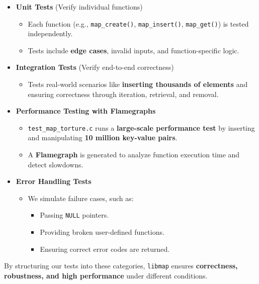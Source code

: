 \documentclass[titlepage]{article}
\begin{document}
\begin{itemize}
    \item \textbf{Unit Tests} (Verify individual functions)
    \begin{itemize}
        \item Each function (e.g., \texttt{map\_create()}, \texttt{map\_insert()}, \texttt{map\_get()}) is tested independently.
        \item Tests include \textbf{edge cases}, invalid inputs, and function-specific logic.
    \end{itemize}

    \item \textbf{Integration Tests} (Verify end-to-end correctness)
    \begin{itemize}
        \item Tests real-world scenarios like \textbf{inserting thousands of elements} and ensuring correctness through iteration, retrieval, and removal.
    \end{itemize}

    \item \textbf{Performance Testing with Flamegraphs}
    \begin{itemize}
        \item \texttt{test\_map\_torture.c} runs a \textbf{large-scale performance test} by inserting and manipulating \textbf{10 million key-value pairs}.
        \item A \textbf{Flamegraph} is generated to analyze function execution time and detect slowdowns.
    \end{itemize}

    \item \textbf{Error Handling Tests}
    \begin{itemize}
        \item We simulate failure cases, such as:
        \begin{itemize}
            \item Passing \texttt{NULL} pointers.
            \item Providing broken user-defined functions.
            \item Ensuring correct error codes are returned.
        \end{itemize}
    \end{itemize}
\end{itemize}

By structuring our tests into these categories, \texttt{libmap} ensures \textbf{correctness, robustness, and high performance} under different conditions.
\end{document}
